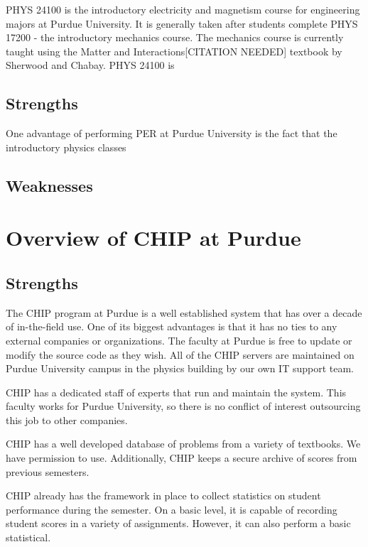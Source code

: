PHYS 24100 is the introductory electricity and magnetism course for engineering majors at Purdue University. It is generally taken after students complete PHYS 17200 - the introductory mechanics course. The mechanics course is currently taught using the Matter and Interactions[CITATION NEEDED] textbook by Sherwood and Chabay. PHYS 24100 is

\subsection{Strengths}

One advantage of performing PER at Purdue University is the fact that the introductory physics classes

\subsection{Weaknesses}

\section{Overview of CHIP at Purdue}

\subsection{Strengths}

The CHIP program at Purdue is a well established system that has over a decade of in-the-field use. One of its biggest advantages is that it has no ties to any external companies or organizations. The faculty at Purdue is free to update or modify the source code as they wish. All of the CHIP servers are maintained on Purdue University campus in the physics building by our own IT support team.

CHIP has a dedicated staff of experts that run and maintain the system. This faculty works for Purdue University, so there is no conflict of interest outsourcing this job to other companies.

CHIP has a well developed database of problems from a variety of textbooks. We have permission to use. Additionally, CHIP keeps a secure archive of scores from previous semesters.

CHIP already has the framework in place to collect statistics on student performance during the semester. On a basic level, it is capable of recording student scores in a variety of assignments. However, it can also perform a basic statistical.

